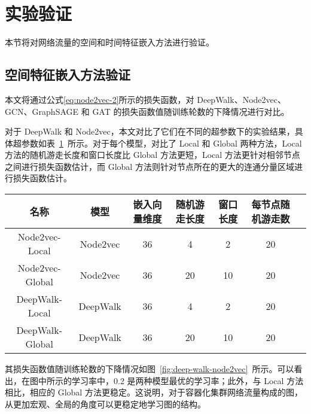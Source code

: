 {\section{实验验证}

本节将对网络流量的空间和时间特征嵌入方法进行验证。

\subsection{空间特征嵌入方法验证}
\label{sec:experiment-spatial}

本文将通过公式\eqref{eq:node2vec-2}所示的损失函数，对 DeepWalk、Node2vec、GCN、GraphSAGE 和 GAT 的损失函数值随训练轮数的下降情况进行对比。

对于 DeepWalk 和 Node2vec，本文对比了它们在不同的超参数下的实验结果，具体超参数如表~\ref{tab:hyperparameters-deep-walk-node2vec}~所示。对于每个模型，对比了 Local 和 Global 两种方法，Local 方法的随机游走长度和窗口长度比 Global 方法更短，Local 方法更针对相邻节点之间进行损失函数估计，而 Global 方法则针对节点所在的更大的连通分量区域进行损失函数估计。

\begin{table}[!htbp]
    \label{tab:hyperparameters-deep-walk-node2vec}
    \centering
    \footnotesize%
    \setlength{\tabcolsep}{4pt}%
    \renewcommand{\arraystretch}{1.2}%
    \begin{tabular}{ccccccc}
        \hline
        名称 & 模型 & 嵌入向量维度 & 随机游走长度 & 窗口长度 & 每节点随机游走数\\
        \hline
        Node2vec-Local & Node2vec & 36 & 4 & 2 & 20\\
        Node2vec-Global & Node2vec & 36 & 20 & 10 & 20\\
        DeepWalk-Local & DeepWalk & 36 & 4 & 2 & 20\\
        DeepWalk-Global & DeepWalk & 36 & 20 & 10 & 20\\
        \hline
    \end{tabular}
\end{table}

其损失函数值随训练轮数的下降情况如图~\ref{fig:deep-walk-node2vec}~所示。可以看出，在图中所示的学习率中，0.2 是两种模型最优的学习率；此外，与 Local 方法相比，相应的 Global 方法更稳定。这说明，对于容器化集群网络流量构成的图，从更加宏观、全局的角度可以更稳定地学习图的结构。

}
